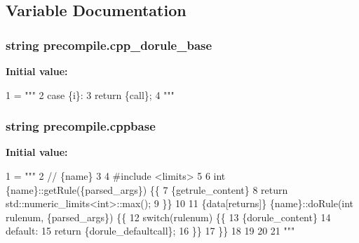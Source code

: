 \subsection{Variable Documentation}
\hypertarget{namespaceprecompile_a2f94726aab8db781d7b05ebe57c45b15}{
\subsubsection[{cpp\-\_\-dorule\-\_\-base}]{\setlength{\rightskip}{0pt plus 5cm}string precompile.\-cpp\-\_\-dorule\-\_\-base}}\label{namespaceprecompile_a2f94726aab8db781d7b05ebe57c45b15}
{\bfseries Initial value\-:}
\begin{DoxyCode}
1 = \textcolor{stringliteral}{"""}
2 \textcolor{stringliteral}{        case \{i\}:}
3 \textcolor{stringliteral}{            return \{call\};}
4 \textcolor{stringliteral}{"""}
\end{DoxyCode}
\hypertarget{namespaceprecompile_addc48dfad488613fed77b317717bd97b}{
\subsubsection[{cppbase}]{\setlength{\rightskip}{0pt plus 5cm}string precompile.\-cppbase}}\label{namespaceprecompile_addc48dfad488613fed77b317717bd97b}
{\bfseries Initial value\-:}
\begin{DoxyCode}
1 = \textcolor{stringliteral}{"""}
2 \textcolor{stringliteral}{// \{name\}}
3 \textcolor{stringliteral}{}
4 \textcolor{stringliteral}{#include <limits>}
5 \textcolor{stringliteral}{}
6 \textcolor{stringliteral}{int \{name\}::getRule(\{parsed\_args\}) \{\{}
7 \textcolor{stringliteral}{\{getrule\_content\}}
8 \textcolor{stringliteral}{    return std::numeric\_limits<int>::max();}
9 \textcolor{stringliteral}{\}\}}
10 \textcolor{stringliteral}{    }
11 \textcolor{stringliteral}{\{data[returns]\} \{name\}::doRule(int rulenum, \{parsed\_args\}) \{\{}
12 \textcolor{stringliteral}{    switch(rulenum) \{\{}
13 \textcolor{stringliteral}{\{dorule\_content\}}
14 \textcolor{stringliteral}{        default:}
15 \textcolor{stringliteral}{            return \{dorule\_defaultcall\};}
16 \textcolor{stringliteral}{    \}\}}
17 \textcolor{stringliteral}{\}\}}
18 \textcolor{stringliteral}{}
19 \textcolor{stringliteral}{}
20 \textcolor{stringliteral}{}
21 \textcolor{stringliteral}{"""}
\end{DoxyCode}
